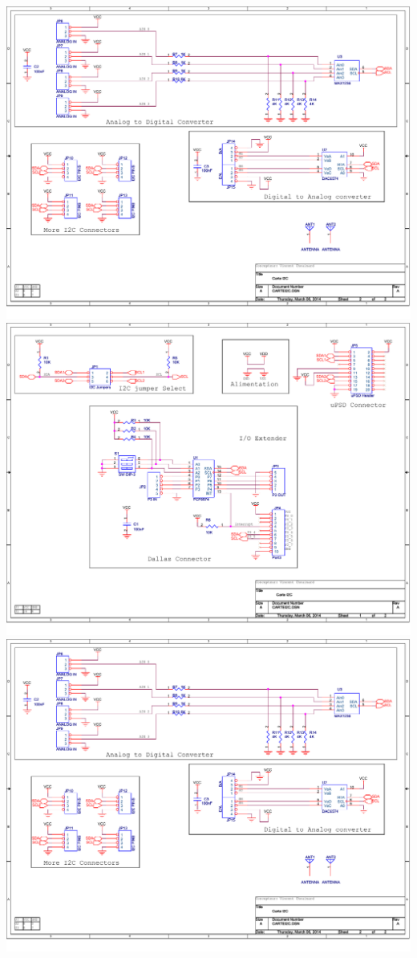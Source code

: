 \begin{multicols}{4}
\includegraphics[scale=0.2,angle=90]{Figures/OrCad/ExtensionI2C2.pdf}
\includegraphics[scale=0.2,angle=90]{Figures/OrCad/ExtensionI2C1.pdf}
\includegraphics[scale=0.2,angle=90]{Figures/OrCad/ExtensionI2C2.pdf}

\end{multicols}
